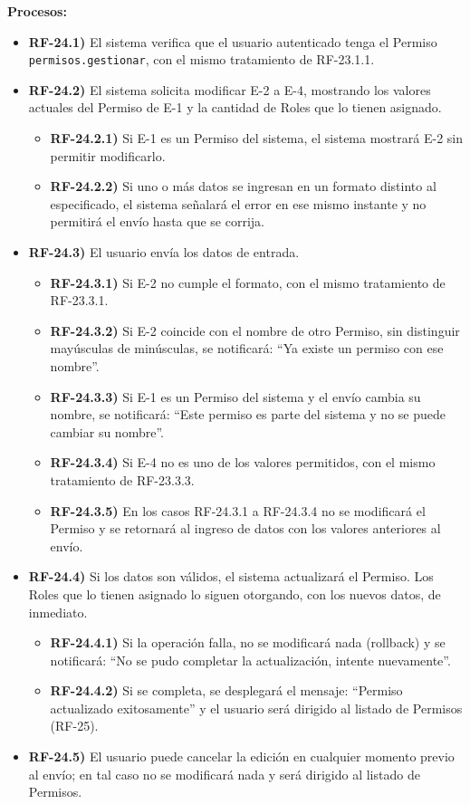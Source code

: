 \textbf{Procesos:}
\begin{itemize}[label={}, leftmargin=1.5em]
  \item \textbf{RF-24.1)} El sistema verifica que el usuario autenticado tenga el Permiso \texttt{permisos.gestionar}, con el mismo tratamiento de RF-23.1.1.
  \item \textbf{RF-24.2)} El sistema solicita modificar E-2 a E-4, mostrando los valores actuales del Permiso de E-1 y la cantidad de Roles que lo tienen asignado.
  \begin{itemize}[label={}, leftmargin=1.5em]
    \item \textbf{RF-24.2.1)} Si E-1 es un Permiso del sistema, el sistema mostrar\'a E-2 sin permitir modificarlo.
    \item \textbf{RF-24.2.2)} Si uno o m\'as datos se ingresan en un formato distinto al especificado, el sistema se\~nalar\'a el error en ese mismo instante y no permitir\'a el env\'io hasta que se corrija.
  \end{itemize}
  \item \textbf{RF-24.3)} El usuario env\'ia los datos de entrada.
  \begin{itemize}[label={}, leftmargin=1.5em]
    \item \textbf{RF-24.3.1)} Si E-2 no cumple el formato, con el mismo tratamiento de RF-23.3.1.
    \item \textbf{RF-24.3.2)} Si E-2 coincide con el nombre de otro Permiso, sin distinguir may\'usculas de min\'usculas, se notificar\'a: ``Ya existe un permiso con ese nombre''.
    \item \textbf{RF-24.3.3)} Si E-1 es un Permiso del sistema y el env\'io cambia su nombre, se notificar\'a: ``Este permiso es parte del sistema y no se puede cambiar su nombre''.
    \item \textbf{RF-24.3.4)} Si E-4 no es uno de los valores permitidos, con el mismo tratamiento de RF-23.3.3.
    \item \textbf{RF-24.3.5)} En los casos RF-24.3.1 a RF-24.3.4 no se modificar\'a el Permiso y se retornar\'a al ingreso de datos con los valores anteriores al env\'io.
  \end{itemize}
  \item \textbf{RF-24.4)} Si los datos son v\'alidos, el sistema actualizar\'a el Permiso. Los Roles que lo tienen asignado lo siguen otorgando, con los nuevos datos, de inmediato.
  \begin{itemize}[label={}, leftmargin=1.5em]
    \item \textbf{RF-24.4.1)} Si la operaci\'on falla, no se modificar\'a nada (rollback) y se notificar\'a: ``No se pudo completar la actualizaci\'on, intente nuevamente''.
    \item \textbf{RF-24.4.2)} Si se completa, se desplegar\'a el mensaje: ``Permiso actualizado exitosamente'' y el usuario ser\'a dirigido al listado de Permisos (RF-25).
  \end{itemize}
  \item \textbf{RF-24.5)} El usuario puede cancelar la edici\'on en cualquier momento previo al env\'io; en tal caso no se modificar\'a nada y ser\'a dirigido al listado de Permisos.
\end{itemize}

